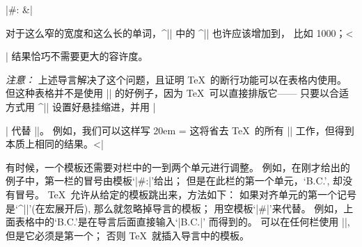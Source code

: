 {{\answer |\hfil#: &\cr|\par\nobreak\medskip\noindent
对于这么窄的宽度和这么长的单词，^|\vtop| 中的 ^|\tolerance| 也许应该增加到，
比如 1000；^^|\strut| 结果恰巧不需要更大的容许度。\par
{\sl 注意：\/} 上述导言解决了这个问题，且证明 \TeX\ 的断行功能可以在表格内使用。
但这种表格并不是使用 |\halign| 的好例子，因为 \TeX\ 可以直接排版它——
只要以合适方式用 ^|\everypar| 设置好悬挂缩进，并用 |\par| 代替 |\cr|。
例如，我们可以这样写
\begintt
\hsize20em \parindent0pt  
\def\history#1&{\hangindent4.5em
  \hbox to4em{\hss#1: }\ignorespaces}
\everypar={\history} \def\\{\leavevmode{\it c\/}}
\endtt
\1这将省去 \TeX\ 的所有 |\halign| 工作，但得到本质上相同的结果。^^|\leavevmode|

\danger \1有时候，一个模板还需要对栏中的一到两个单元进行调整。%
例如，在刚才给出的例子中，第一栏的冒号由模板`|\hfil#:|\]'给出；
但是在此栏的第一个单元，`{\sevenrm B.C.}', 却没有冒号。%
 \TeX\ 允许从给定的模板跳出来，方法如下：
如果对齐单元的第一个记号是`^|\omit|'(在宏展开后),
那么就忽略掉导言的模板；
用空模板`|#|'来代替。%
例如，上面表格中的`{\sevenrm B.C.}'是在导言后面直接输入`|\omit\hfil\sevenrm B.C.|'%
而得到的。%
可以在任何栏使用 |\omit|, 但是它必须是第一个；
否则 \TeX\ 就插入导言中的模板。

}}
